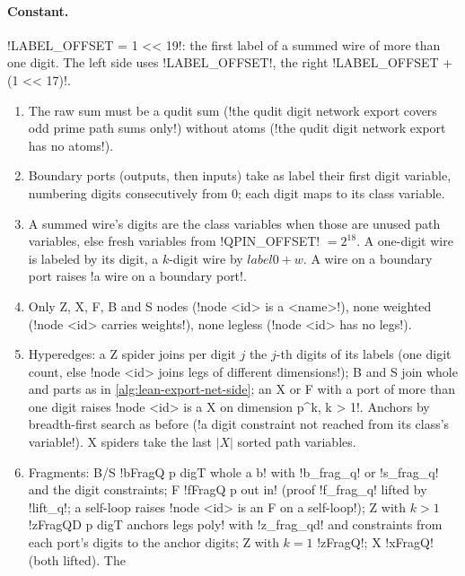 {{{\paragraph{Constant.} \lexpy!LABEL_OFFSET = 1 << 19!: the first label of a summed wire of more
than one digit. The left side uses \lexpy!LABEL_OFFSET!, the right \lexpy!LABEL_OFFSET + (1 << 17)!.

\begin{algorithm}\label{alg:lean-export-qdigits-side}
\begin{enumerate}
\item The raw sum must be a qudit sum (\lexcode!the qudit digit network export covers odd prime path sums only!) without atoms (\lexcode!the qudit digit network export has no atoms!).
\item Boundary ports (outputs, then inputs) take as label their first digit variable, numbering
digits consecutively from 0; each digit maps to its class variable.
\item A summed wire's digits are the class variables when those are unused path variables, else
fresh variables from \lexpy!QPIN_OFFSET! $=2^{18}$. A one-digit wire is labeled by its digit, a
$k$-digit wire by $\mathit{label0}+w$. A wire on a boundary port raises \lexcode!a wire on a boundary port!.
\item Only Z, X, F, B and S nodes (\lexcode!node <id> is a <name>!), none weighted
(\lexcode!node <id> carries weights!), none legless (\lexcode!node <id> has no legs!).
\item Hyperedges: a Z spider joins per digit $j$ the $j$-th digits of its labels (one digit count,
else \lexcode!node <id> joins legs of different dimensions!); B and S join whole and parts as in
\cref{alg:lean-export-net-side}; an X or F with a port of more than one digit raises
\lexcode!node <id> is a X on dimension p^k, k > 1!. Anchors by breadth-first search as before
(\lexcode!a digit constraint not reached from its class's variable!). X spiders take the last
$|X|$ sorted path variables.
\item Fragments: B/S \lexlean!bFragQ p digT whole a b! with \lexlean!b_frag_q! or \lexlean!s_frag_q! and
the digit constraints; F \lexlean!fFragQ p out in! (proof \lexlean!f_frag_q! lifted by
\lexlean!lift_q!; a self-loop raises \lexcode!node <id> is an F on a self-loop!); Z with $k>1$
\lexlean!zFragQD p digT anchors legs poly! with \lexlean!z_frag_qd! and constraints from each port's
digits to the anchor digits; Z with $k=1$ \lexlean!zFragQ!; X \lexlean!xFragQ! (both lifted). The

\end{enumerate}
\end{algorithm}}}}
